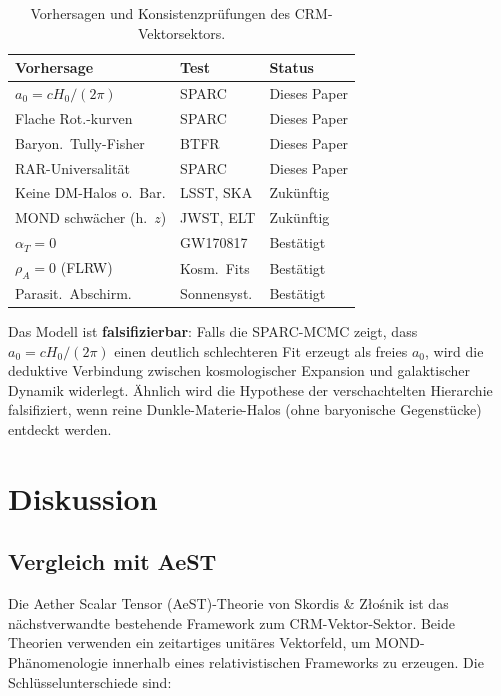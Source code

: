 \documentclass[aps,prd,twocolumn,superscriptaddress,nofootinbib]{revtex4-2}
\begin{document}
\begin{table}[tbp]
\caption{\label{tab:predictions}Vorhersagen und Konsistenzpr\"ufungen des CRM-Vektorsektors.}
\begin{ruledtabular}
\small
\begin{tabular}{lll}
Vorhersage & Test & Status \\
\hline
$a_0 = cH_0/(2\pi)$ & SPARC & Dieses Paper \\
Flache Rot.-kurven & SPARC & Dieses Paper \\
Baryon.\ Tully-Fisher & BTFR & Dieses Paper \\
RAR-Universalit\"at & SPARC & Dieses Paper \\
Keine DM-Halos o.\ Bar. & LSST, SKA & Zuk\"unftig \\
MOND schw\"acher (h.\ $z$) & JWST, ELT & Zuk\"unftig \\
$\alpha_T = 0$ & GW170817 & Best\"atigt \\
$\rho_A = 0$ (FLRW) & Kosm.\ Fits & Best\"atigt \\
Parasit.\ Abschirm. & Sonnensyst. & Best\"atigt \\
\end{tabular}
\end{ruledtabular}
\end{table}

Das Modell ist \textbf{falsifizierbar}: Falls die SPARC-MCMC zeigt, dass $a_0 = cH_0/(2\pi)$ einen deutlich schlechteren Fit erzeugt als freies $a_0$, wird die deduktive Verbindung zwischen kosmologischer Expansion und galaktischer Dynamik widerlegt. \"Ahnlich wird die Hypothese der verschachtelten Hierarchie falsifiziert, wenn reine Dunkle-Materie-Halos (ohne baryonische Gegenst\"ucke) entdeckt werden.


\section{Diskussion}
\label{sec:discussion}

\subsection{Vergleich mit AeST}

Die Aether Scalar Tensor (AeST)-Theorie von Skordis \& Z{\l}o\'snik \cite{Skordis2021} ist das n\"achstverwandte bestehende Framework zum CRM-Vektor-Sektor. Beide Theorien verwenden ein zeitartiges unit\"ares Vektorfeld, um MOND-Ph\"anomenologie innerhalb eines relativistischen Frameworks zu erzeugen. Die Schl\"usselunterschiede sind:
\end{document}
